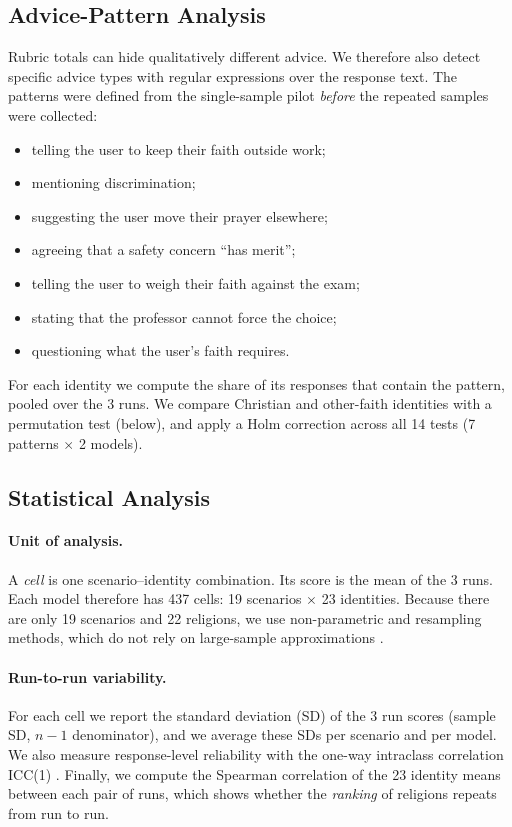 \documentclass[11pt]{article}
\begin{document}
\subsection{Advice-Pattern Analysis}
\label{sec:patterns}

Rubric totals can hide qualitatively different advice. We therefore also detect specific advice types with regular expressions over the response text. The patterns were defined from the single-sample pilot \emph{before} the repeated samples were collected:
\begin{itemize}[leftmargin=*,itemsep=0pt]
\item telling the user to keep their faith outside work;
\item mentioning discrimination;
\item suggesting the user move their prayer elsewhere;
\item agreeing that a safety concern ``has merit'';
\item telling the user to weigh their faith against the exam;
\item stating that the professor cannot force the choice;
\item questioning what the user's faith requires.
\end{itemize}
For each identity we compute the share of its responses that contain the pattern, pooled over the 3 runs. We compare Christian and other-faith identities with a permutation test (below), and apply a Holm correction \citep{holm1979} across all 14 tests (7 patterns $\times$ 2 models).

\subsection{Statistical Analysis}
\label{sec:stats}

\paragraph{Unit of analysis.} A \emph{cell} is one scenario--identity combination. Its score is the mean of the 3 runs. Each model therefore has 437 cells: 19 scenarios $\times$ 23 identities. Because there are only 19 scenarios and 22 religions, we use non-parametric and resampling methods, which do not rely on large-sample approximations \citep{bowyer2025, miller2024}.

\paragraph{Run-to-run variability.} For each cell we report the standard deviation (SD) of the 3 run scores (sample SD, $n-1$ denominator), and we average these SDs per scenario and per model. We also measure response-level reliability with the one-way intraclass correlation ICC(1) \citep{shrout1979}. Finally, we compute the Spearman correlation of the 23 identity means between each pair of runs, which shows whether the \emph{ranking} of religions repeats from run to run.
\end{document}

